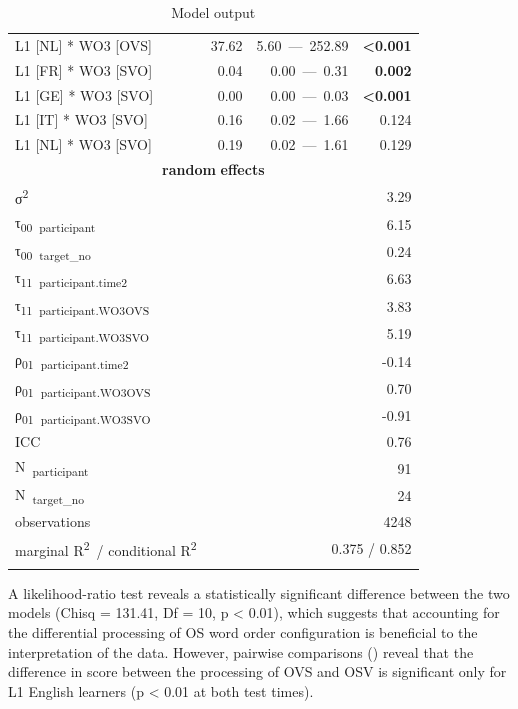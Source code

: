 \begin{table}
\begin{tabularx}{\textwidth}{Xrrr}
    L1 [NL] * WO3 [OVS] & 37.62 & 5.60~—~252.89 & \textbf{<0.001}\\
    L1 [FR] * WO3 [SVO] & 0.04 & 0.00~—~0.31 & \textbf{0.002}\\
    L1 [GE] * WO3 [SVO] & 0.00 & 0.00~—~0.03 & \textbf{<0.001}\\
    L1 [IT] * WO3 [SVO] & 0.16 & 0.02~—~1.66 & 0.124\\
    L1 [NL] * WO3 [SVO] & 0.19 & 0.02~—~1.61 & 0.129\\
    \multicolumn{4}{c}{\textbf{random} \textbf{effects}}\\
    σ\textsuperscript{2} & \multicolumn{3}{r}{3.29}\\
    τ\textsubscript{00}~\textsubscript{participant} & \multicolumn{3}{r}{6.15}\\
    τ\textsubscript{00}~\textsubscript{target\_no} & \multicolumn{3}{r}{0.24}\\
    τ\textsubscript{11}~\textsubscript{participant.time2} & \multicolumn{3}{r}{6.63}\\
    τ\textsubscript{11}~\textsubscript{participant.WO3OVS} & \multicolumn{3}{r}{3.83}\\
    τ\textsubscript{11}~\textsubscript{participant.WO3SVO} & \multicolumn{3}{r}{5.19}\\
    ρ\textsubscript{01}~\textsubscript{participant.time2} & \multicolumn{3}{r}{{}-0.14}\\
    ρ\textsubscript{01}~\textsubscript{participant.WO3OVS} & \multicolumn{3}{r}{0.70}\\
    ρ\textsubscript{01}~\textsubscript{participant.WO3SVO} & \multicolumn{3}{r}{{}-0.91}\\
    ICC & \multicolumn{3}{r}{0.76}\\
    N~\textsubscript{participant} & \multicolumn{3}{r}{91}\\
    N~\textsubscript{target\_no} & \multicolumn{3}{r}{24}\\
    observations & \multicolumn{3}{r}{4248}\\
    marginal R\textsuperscript{2}~/ conditional R\textsuperscript{2} & \multicolumn{3}{r}{0.375 / 0.852}\\
    \lspbottomrule
    \end{tabularx}
    \caption{Model output}
    \label{tab:05:9}
\end{table}

A likelihood-ratio test reveals a statistically significant difference between the two models (Chisq = 131.41, Df = 10, p < 0.01), which suggests that accounting for the differential processing of OS word order configuration is beneficial to the interpretation of the data. However, pairwise comparisons () reveal that the difference in score between the processing of OVS and OSV is significant only for L1 English learners (p < 0.01 at both test times).

